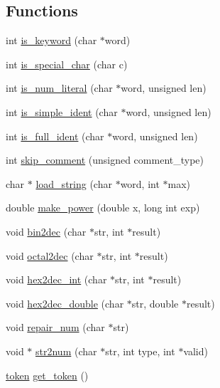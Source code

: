 \subsection*{Functions}
\begin{DoxyCompactItemize}
\item 
int \hyperlink{group__lexical__analysis_ga29b2c45c3fe2c8939bbdc89171b5a487}{is\+\_\+keyword} (char $\ast$word)
\item 
int \hyperlink{group__lexical__analysis_ga168691f781d1ddb8829f6df3fad19a07}{is\+\_\+special\+\_\+char} (char c)
\item 
int \hyperlink{group__lexical__analysis_ga98754c5038b4c4ffe5699220e747b016}{is\+\_\+num\+\_\+literal} (char $\ast$word, unsigned len)
\item 
int \hyperlink{group__lexical__analysis_ga9eca3c676e5eee26ab4d601f61f2de75}{is\+\_\+simple\+\_\+ident} (char $\ast$word, unsigned len)
\item 
int \hyperlink{group__lexical__analysis_ga7676b19b6f661874980abb7f4d06cee7}{is\+\_\+full\+\_\+ident} (char $\ast$word, unsigned len)
\item 
int \hyperlink{group__lexical__analysis_ga2edeff46aba998af936ac79fbc1a67d6}{skip\+\_\+comment} (unsigned comment\+\_\+type)
\item 
char $\ast$ \hyperlink{group__lexical__analysis_ga2a641c333a84be721332832873279f15}{load\+\_\+string} (char $\ast$word, int $\ast$max)
\item 
double \hyperlink{group__lexical__analysis_ga8e51c3979e83ce503621c22bad33e22c}{make\+\_\+power} (double x, long int exp)
\item 
void \hyperlink{group__lexical__analysis_gafcfd2119c62522337ed1eb55fc0db642}{bin2dec} (char $\ast$str, int $\ast$result)
\item 
void \hyperlink{group__lexical__analysis_gaf0e8939e2c9ba4dbf8db1b62168ab5dc}{octal2dec} (char $\ast$str, int $\ast$result)
\item 
void \hyperlink{group__lexical__analysis_gaf63ca88c1914f1496fb2624b3dcbd62b}{hex2dec\+\_\+int} (char $\ast$str, int $\ast$result)
\item 
void \hyperlink{group__lexical__analysis_ga1d6e4ef783b1b166d3a97123b971dd29}{hex2dec\+\_\+double} (char $\ast$str, double $\ast$result)
\item 
void \hyperlink{group__lexical__analysis_ga773ab50d415efa6827c8528968fd163b}{repair\+\_\+num} (char $\ast$str)
\item 
void $\ast$ \hyperlink{group__lexical__analysis_ga3a4b03b0e7dc0a934ec5f0f8bb319f33}{str2num} (char $\ast$str, int type, int $\ast$valid)
\item 
\hyperlink{structtoken}{token} \hyperlink{group__lexical__analysis_ga1c93e45d35d6d87f40ede65e44315cd3}{get\+\_\+token} ()
\end{DoxyCompactItemize}
